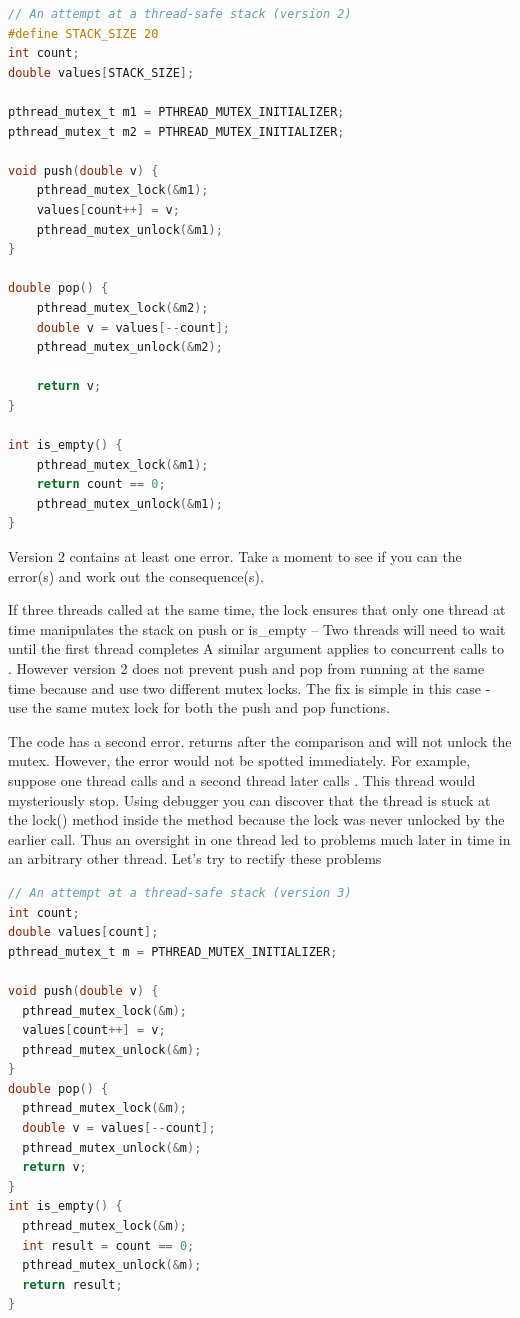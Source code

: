 \begin{lstlisting}[language=C]
// An attempt at a thread-safe stack (version 2)
#define STACK_SIZE 20
int count;
double values[STACK_SIZE];

pthread_mutex_t m1 = PTHREAD_MUTEX_INITIALIZER;
pthread_mutex_t m2 = PTHREAD_MUTEX_INITIALIZER;

void push(double v) {
    pthread_mutex_lock(&m1);
    values[count++] = v;
    pthread_mutex_unlock(&m1);
}

double pop() {
    pthread_mutex_lock(&m2);
    double v = values[--count];
    pthread_mutex_unlock(&m2);

    return v;
}

int is_empty() {
    pthread_mutex_lock(&m1);
    return count == 0;
    pthread_mutex_unlock(&m1);
}
\end{lstlisting}

Version 2 contains at least one error.
Take a moment to see if you can the error(s) and work out the consequence(s).

If three threads called  at the same time, the lock  ensures that only one thread at time manipulates the stack on push or is\_empty -- Two threads will need to wait until the first thread completes
A similar argument applies to concurrent calls to .
However version 2 does not prevent push and pop from running at the same time because  and  use two different mutex locks.
The fix is simple in this case - use the same mutex lock for both the push and pop functions.

The code has a second error.
 returns after the comparison and will not unlock the mutex.
However, the error would not be spotted immediately.
For example, suppose one thread calls  and a second thread later calls .
This thread would mysteriously stop.
Using debugger you can discover that the thread is stuck at the lock() method inside the  method because the lock was never unlocked by the earlier  call.
Thus an oversight in one thread led to problems much later in time in an arbitrary other thread.
Let's try to rectify these problems

\begin{lstlisting}[language=C]
// An attempt at a thread-safe stack (version 3)
int count;
double values[count];
pthread_mutex_t m = PTHREAD_MUTEX_INITIALIZER;

void push(double v) {
  pthread_mutex_lock(&m);
  values[count++] = v;
  pthread_mutex_unlock(&m);
}
double pop() {
  pthread_mutex_lock(&m);
  double v = values[--count];
  pthread_mutex_unlock(&m);
  return v;
}
int is_empty() {
  pthread_mutex_lock(&m);
  int result = count == 0;
  pthread_mutex_unlock(&m);
  return result;
}
\end{lstlisting}

